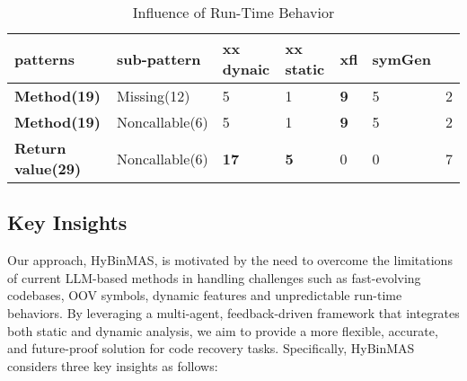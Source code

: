 \documentclass[acmsmall,screen,review,anonymous]{acmart} %
\begin{document}


\begin{table}[t]
  \centering
  \footnotesize
  \caption{Influence of Run-Time Behavior}
  \label{tab:dynamic_example}
  \renewcommand\arraystretch{1.15}
\begin{tabular}{p{1.7cm}p{1.7cm}p{1.2cm}p{1.2cm}p{1.2cm}p{1.2cm}p{1.2cm}}
\toprule
patterns & sub-pattern &xx dynaic &xx static & xfl &symGen    \\
\midrule
\textbf{Method(19)} & Missing(12) &5 &1 &\textbf{9} &5 &2 \\
\textbf{Method(19)} & Noncallable(6) &5 &1 &\textbf{9} &5 &2 \\
\textbf{Return value(29)} & Noncallable(6) &\textbf{17}&\textbf{5}&0&0&7\\
\bottomrule
\end{tabular}
\end{table}


\subsection{Key Insights}

Our approach, HyBinMAS, is motivated by the need to overcome the limitations of current LLM-based methods in handling challenges such as fast-evolving codebases, OOV symbols, dynamic features and unpredictable run-time behaviors. By leveraging a multi-agent, feedback-driven framework that integrates both static and dynamic analysis, we aim to provide a more flexible, accurate, and future-proof solution for code recovery tasks. %
Specifically, HyBinMAS considers three key insights as follows:
\end{document}
